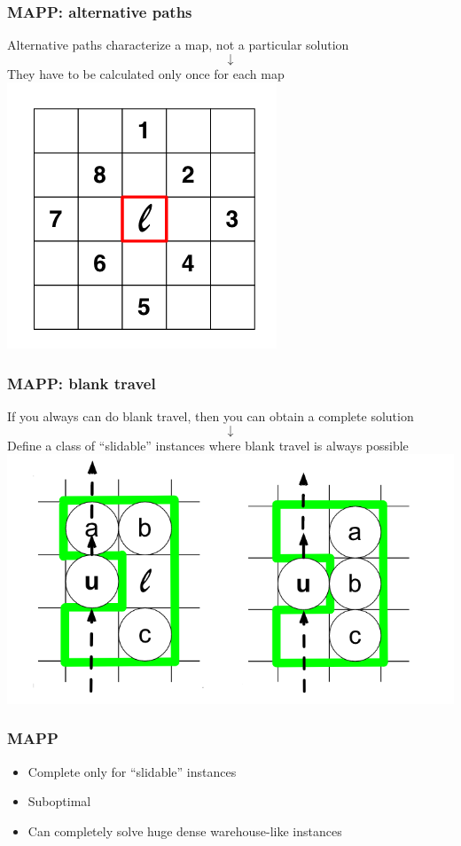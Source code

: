 \documentclass{beamer}
\begin{document}
\begin{frame}
\frametitle{MAPP: alternative paths}
Alternative paths characterize a map, not a particular solution
\centering
$$\downarrow $$
They have to be calculated only once for each map
\centering
\includegraphics[scale=1.0]{MAPP_alt_paths.png}
\end{frame}

\begin{frame}
\frametitle{MAPP: blank travel}
If you always can do blank travel, then you can obtain a complete solution
$$\downarrow$$
Define a class of ``slidable'' instances where blank travel is always possible \\
\centering
\includegraphics[scale=0.5]{MAPP_blank.png}
\end{frame}

\begin{frame}
\frametitle{MAPP}
\begin{itemize} 
\item Complete only for ``slidable'' instances 
\item Suboptimal
\item Can completely solve huge dense warehouse-like instances
\end{itemize} 
\end{frame}
\end{document}
